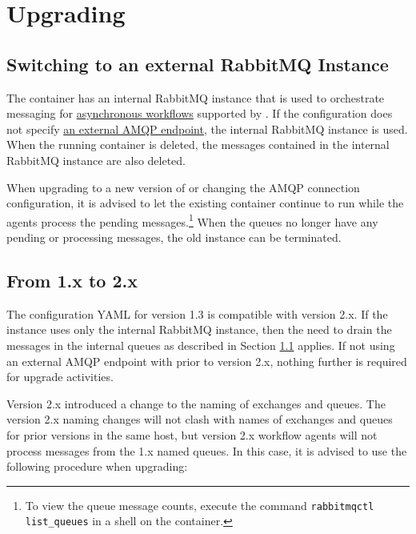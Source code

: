 \chapter{Upgrading}

\section{Switching to an external RabbitMQ Instance}\label{sec:rmq-switch}

The \cxoneflow container has an internal RabbitMQ instance that is used to orchestrate messaging 
for \hyperref[part:workflows]{asynchronous workflows} supported by \cxoneflow.  If the configuration
does not specify \hyperref[sec:amqp-element]{an external AMQP endpoint}, the internal RabbitMQ instance
is used.  When the running \cxoneflow container is deleted, the messages contained in the internal
RabbitMQ instance are also deleted.

When upgrading to a new version of \cxoneflow or changing the AMQP connection configuration, it is advised
to let the existing \cxoneflow container continue to run while the agents process the pending messages.\footnote{To view 
the queue message counts, execute the command \texttt{rabbitmqctl list\_queues} in a shell on the \cxoneflow container.}  
When the queues no longer have any pending or processing messages, the old \cxoneflow instance can be terminated.

\section{From 1.x to 2.x}

The configuration YAML for version 1.3 is compatible with version 2.x.  If the \cxoneflow instance uses only the internal
RabbitMQ instance, then the need to drain the messages in the internal queues as described in Section \ref{sec:rmq-switch}
applies.  If not using an external AMQP endpoint with \cxoneflow prior to version 2.x, nothing further is required for 
upgrade activities.

Version 2.x introduced a change to the naming of exchanges and queues.  The version 2.x naming changes will not clash with
names of exchanges and queues for prior versions in the same host, but version 2.x workflow agents will not process messages
from the 1.x named queues.  In this case, it is advised to use the following procedure when upgrading:

